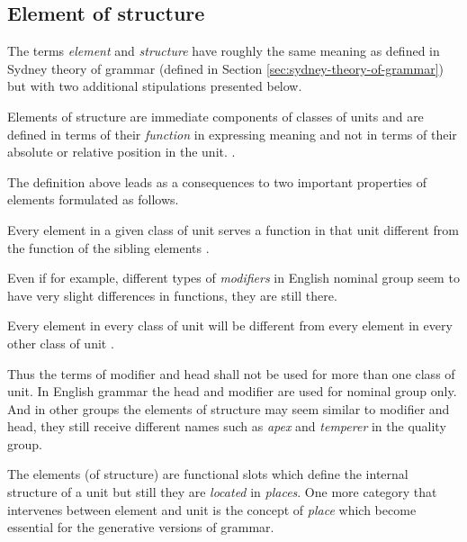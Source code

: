 \subsection{Element of structure}
\label{sec:elements-of-structure}

The terms \textit{element} and \textit{structure} have roughly the same meaning as defined in Sydney theory of grammar (defined in Section \ref{sec:sydney-theory-of-grammar}) but with two additional stipulations presented below.

\begin{definition}\label{def:elementStructure}
	Elements of structure are immediate components of classes of units and are defined in terms of their \textit{function} in expressing meaning and not in terms of their absolute or relative position in the unit. \citep[213--214]{Fawcett2000}. 
\end{definition}

The definition above leads as a consequences to two important properties of elements formulated as follows.

\begin{generalization}
Every element in a given class of unit serves a function in that unit different from the function of the sibling elements \citep[214]{Fawcett2000}. 
\end{generalization} 

Even if for example, different types of \textit{modifiers} in English nominal group seem to have very slight differences in functions, they are still there.

\begin{generalization}
    Every element in every class of unit will be different from every element in every other class of unit \citep[214]{Fawcett2000}. 
\end{generalization} 

Thus the terms of modifier and head shall not be used for more than one class of unit. In English grammar the head and modifier are used for nominal group only. And in other groups the elements of structure may seem similar to modifier and head, they still receive different names such as \textit{apex} and \textit{temperer} in the quality group.

The elements (of structure) are functional slots which define the internal structure of a unit but still they are \textit{located} in \textit{places}. One more category that intervenes between element and unit is the concept of \textit{place} which become essential for the generative versions of grammar.

